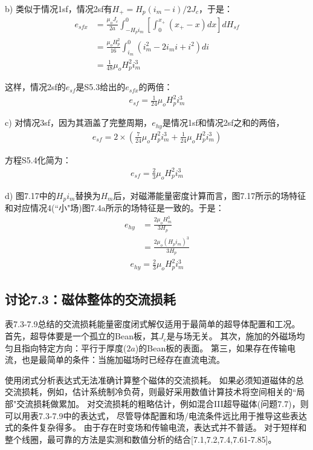 b) 类似于情况1sf，情况2sf有$H_+=H_p(i_m-i)/2J_c$，于是：
\begin{align*}%
e_{sfx}&=\frac{\mu_oJ_c}{2a}\int_{-H_pi_m}^{0}\left[\int_{0}^{x_+}(x_+-x)dx\right]dH_{sf} \\
&=\frac{\mu_oH_{p}^{2}}{16}\int_{i_m}^{0}(i_{m}^{2}-2i_mi+i^2)di \\
&=\frac{1}{48}\mu_oH_{p}^{2}i_{m}^{3} \tag{S5.3c}
\end{align*}

这样，情况2sf的$e_{sf}$是S5.3给出的$e_{sfx}$的两倍：
\begin{align*}%
e_{sf}=\frac{1}{24}\mu_oH_{p}^{2}i_{m}^{3} \tag{7.26b}
\end{align*}

c) 对情况3sf，因为其涵盖了完整周期，$e_{hy}$是情况1sf和情况2sf之和的两倍，
\begin{align*}%
e_{sf}=2\times\left(\frac{7}{24}\mu_oH_{p}^{2}i_{m}^{3}+\frac{1}{24}\mu_oH_{p}^{2}i_{m}^{3}\right) \tag{S5.4}
\end{align*}

方程S5.4化简为：
\begin{align*}%
e_{sf}=\frac{2}{3}\mu_oH_{p}^{2}i_{m}^{3} \tag{7.26c}
\end{align*}

d) 图7.17中的$H_p i_m$替换为$H_m$后，对磁滞能量密度计算而言，图7.17所示的场特征和对应情况4(``小"场)图7.4a所示的场特征是一致的。于是：
\begin{align*}%
e_{hy}&=\frac{2\mu_oH_{m}^{3}}{3H_p} \\ \tag{7.20a}
&=\frac{2\mu_o(H_pi_m)^3}{3H_p} 
\end{align*}
\begin{align*}
e_{hy}=\frac{2}{3}\mu_oH_{p}^{2}i_{m}^{3} \tag{7.26c}
\end{align*}


\subsection{讨论7.3：磁体整体的交流损耗}
表7.3-7.9总结的交流损耗能量密度闭式解仅适用于最简单的超导体配置和工况。
首先，超导体要是一个孤立的Bean板，其$J_c$是与场无关。
其次，施加的外磁场均匀且指向特定方向：平行于厚度($2a$)的Bean板的表面。
第三，如果存在传输电流，也是最简单的条件：当施加磁场时已经存在直流电流。

使用闭式分析表达式无法准确计算整个磁体的交流损耗。
如果必须知道磁体的总交流损耗，例如，估计系统制冷负荷，则最好采用数值计算技术将空间相关的``局部"交流损耗做累加。
对交流损耗的粗略估计，例如混合III超导磁体(问题7.7)，则可以用表7.3-7.9中的表达式，
尽管导体配置和场/电流条件远比用于推导这些表达式的条件复杂得多。
由于存在时变场和传输电流，表达式并不普适。
对于短样和整个线圈，最可靠的方法是实测和数值分析的结合[7.1,7.2,7.4,7.61-7.85]。


